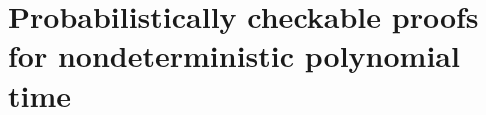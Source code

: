 \documentclass{article}
\begin{document}



\section{Probabilistically checkable proofs for nondeterministic polynomial time}\label{sec:dinur}
\end{document}
